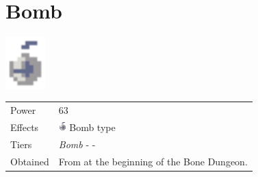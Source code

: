 \section{Bomb}
\label{weapon:bomb}

\includegraphics[height=2cm,keepaspectratio]{./resources/weapons/bomb}

\begin{longtable}{ l p{9cm} }
	Power
	& 63
\\ %
	Effects
	& \includegraphics[height=1em,keepaspectratio]{./resources/effects/bomb}
	Bomb type
\\ %
	Tiers
	& \textit{Bomb} - \nameref{weapon:jumbo_bomb} - \nameref{weapon:mega_grenade}
\\ %
	Obtained
	& From \nameref{char:tristam} at the beginning of the Bone Dungeon.
\end{longtable}
